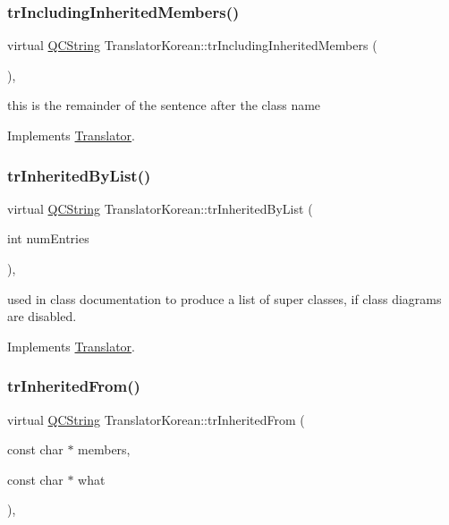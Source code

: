 \subsubsection{\texorpdfstring{trIncludingInheritedMembers()}{trIncludingInheritedMembers()}}
{\footnotesize\ttfamily virtual \mbox{\hyperlink{class_q_c_string}{Q\+C\+String}} Translator\+Korean\+::tr\+Including\+Inherited\+Members (\begin{DoxyParamCaption}{ }\end{DoxyParamCaption})\hspace{0.3cm}{\ttfamily [inline]}, {\ttfamily [virtual]}}

this is the remainder of the sentence after the class name 

Implements \mbox{\hyperlink{class_translator}{Translator}}.

\mbox{\label{class_translator_korean_a4f4e11bd97bbc8085f27acc24ed3589f}} 
\subsubsection{\texorpdfstring{trInheritedByList()}{trInheritedByList()}}
{\footnotesize\ttfamily virtual \mbox{\hyperlink{class_q_c_string}{Q\+C\+String}} Translator\+Korean\+::tr\+Inherited\+By\+List (\begin{DoxyParamCaption}\item[{int}]{num\+Entries }\end{DoxyParamCaption})\hspace{0.3cm}{\ttfamily [inline]}, {\ttfamily [virtual]}}

used in class documentation to produce a list of super classes, if class diagrams are disabled. 

Implements \mbox{\hyperlink{class_translator}{Translator}}.

\mbox{\label{class_translator_korean_a39ef233d8406f38840c602e193655a9a}} 
\subsubsection{\texorpdfstring{trInheritedFrom()}{trInheritedFrom()}}
{\footnotesize\ttfamily virtual \mbox{\hyperlink{class_q_c_string}{Q\+C\+String}} Translator\+Korean\+::tr\+Inherited\+From (\begin{DoxyParamCaption}\item[{const char $\ast$}]{members,  }\item[{const char $\ast$}]{what }\end{DoxyParamCaption})\hspace{0.3cm}{\ttfamily [inline]}, {\ttfamily [virtual]}}

